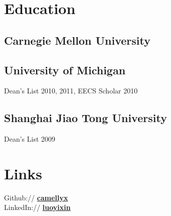 \documentclass[]{resume}
\begin{document}
%
%
\lastupdated%

%
%

%
%

\begin{minipage}[t]{0.35\textwidth}


\section{Education}

\subsection{Carnegie Mellon University}
\sectionsep%

\subsection{University of Michigan}
Dean's List 2010, 2011, EECS Scholar 2010 \\
\sectionsep%

\subsection{Shanghai Jiao Tong University}
Dean's List 2009 \\



\section{Links}
Github:// \href{https://github.com/camellyx}{\bf camellyx} \\
LinkedIn:// \href{https://www.linkedin.com/in/luoyixin}{\bf luoyixin} \\


\end{minipage}
\end{document}

